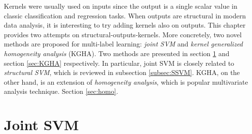Kernels were usually used on inputs since the output is a single scalar value in classic classification and regression tasks.   
When outputs are structural in modern data analysis, it is interesting to try adding kernels also on outputs.     
This chapter provides two attempts on structural-outputs-kernels. 
More concretely, two novel methods are proposed for multi-label learning: \emph{joint SVM} and \emph{kernel generalized homogeneity analysis} (KGHA). 
Two methods are presented in section \ref{sec:joint_SVM} and section \ref{sec:KGHA} respectively. In particular, joint SVM is closely related to 
\emph{structural SVM}, which is reviewed in subsection \ref{subsec:SSVM}. KGHA, on the other hand, is an extension of \emph{homogeneity analysis}, which is 
popular multivariate analysis technique. Section \ref{sec:homo}.




\section{Joint SVM}
\label{sec:joint_SVM}

